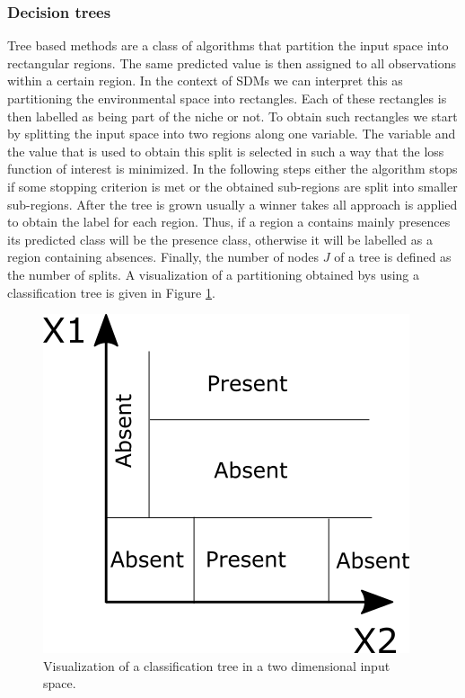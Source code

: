 \subsubsection{Decision trees}
\label{sec:DecisionTrees}
Tree based methods are a class of algorithms that partition the input space into rectangular regions. The same predicted value is then assigned to all observations within a certain region. In the context of SDMs we can interpret this as partitioning the environmental space into rectangles. Each of these rectangles is then labelled as being part of the niche or not. To obtain such rectangles we start by splitting the input space into two regions along one variable. The variable and the value that is used to obtain this split is selected in such a way that the loss function of interest is minimized. In the following steps either the algorithm stops if some stopping criterion is met or the obtained sub-regions are split into smaller sub-regions. After the tree is grown usually a winner takes all approach is applied to obtain the label for each region. Thus, if a region a contains mainly presences its predicted class will be the presence class, otherwise it will be labelled as a region containing absences. Finally, the number of nodes $J$ of a tree is defined as the number of splits. A visualization of a partitioning obtained bys using a classification tree is given in Figure \ref{fig:chClassificationTechniques:CART}.

\begin{figure}[!htb]
\centering
\includegraphics[scale=0.5]{VectorGraphics/CART.png}
\caption{\label{fig:chClassificationTechniques:CART}Visualization of a classification tree in a two dimensional input space.}
\end{figure}

